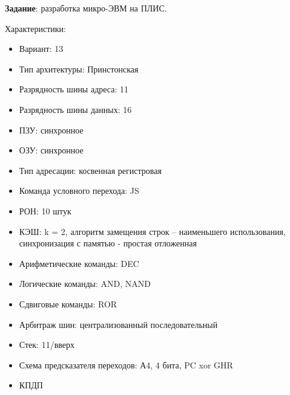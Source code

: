 \thispagestyle{empty}


\begin{flushleft}
    \textbf{Задание}: разработка микро-ЭВМ на ПЛИС.

    Характеристики:
\end{flushleft}

\begin{itemize}
\item Вариант: 13
\item Тип архитектуры: Принстонская
\item Разрядность шины адреса: 11
\item Разрядность шины данных: 16
\item ПЗУ: синхронное
\item ОЗУ: синхронное
\item Тип адресации: косвенная регистровая
\item Команда условного перехода: JS
\item РОН: 10 штук
\item КЭШ: k = 2, алгоритм замещения строк – наименьшего использования, синхронизация с памятью - простая отложенная
\item Арифметические команды: DEC
\item Логические команды: AND, NAND
\item Сдвиговые команды: ROR
\item Арбитраж шин: централизованный последовательный
\item Стек: 11/вверх
\item Схема предсказателя переходов: А4, 4 бита, PC xor GHR
\item КПДП
\end{itemize}

\clearpage
